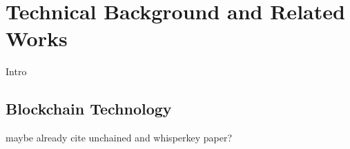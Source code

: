 \documentclass{llncs}
\begin{document}
{	%

	\section{Technical Background and Related Works}	
		\label{section-2}
		
		Intro

%		
		
		\subsection{Blockchain Technology}
			\label{ss:blockchain-intro}
			
			maybe already cite unchained and whisperkey paper?
			
			
		
}
\end{document}
